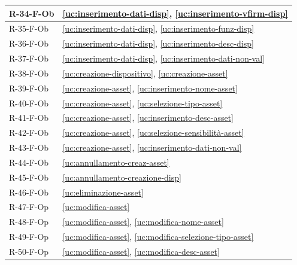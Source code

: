 ﻿\documentclass[a4paper,12pt]{article}
\begin{document}
{\begin{longtable}{|
      >{\centering\arraybackslash}p{}|
      >{\centering\arraybackslash}p{}|
      }
            R-34-F-Ob       & \ref{uc:inserimento-dati-disp}, \ref{uc:inserimento-vfirm-disp}         \\ \hline
            R-35-F-Ob       & \ref{uc:inserimento-dati-disp}, \ref{uc:inserimento-funz-disp}         \\ \hline
            R-36-F-Ob       & \ref{uc:inserimento-dati-disp}, \ref{uc:inserimento-desc-disp}         \\ \hline
            R-37-F-Ob       & \ref{uc:inserimento-dati-disp}, \ref{uc:inserimento-dati-non-val}                 \\ \hline
            R-38-F-Ob       & \ref{uc:creazione-dispositivo}, \ref{uc:creazione-asset}                     \\ \hline
            R-39-F-Ob       & \ref{uc:creazione-asset}, \ref{uc:inserimento-nome-asset}                 \\ \hline
            R-40-F-Ob       & \ref{uc:creazione-asset}, \ref{uc:selezione-tipo-asset}                 \\ \hline
            R-41-F-Ob       & \ref{uc:creazione-asset}, \ref{uc:inserimento-desc-asset}                 \\ \hline
            R-42-F-Ob       & \ref{uc:creazione-asset}, \ref{uc:selezione-sensibilità-asset}                 \\ \hline
            R-43-F-Ob       & \ref{uc:creazione-asset}, \ref{uc:inserimento-dati-non-val}                     \\ \hline
            R-44-F-Ob       & \ref{uc:annullamento-creaz-asset}                                               \\ \hline
            R-45-F-Ob       & \ref{uc:annullamento-creazione-disp}                                               \\ \hline
            R-46-F-Ob       & \ref{uc:eliminazione-asset}                                               \\ \hline
            R-47-F-Op       & \ref{uc:modifica-asset}                                               \\ \hline
            R-48-F-Op       & \ref{uc:modifica-asset}, \ref{uc:modifica-nome-asset}                 \\ \hline
            R-49-F-Op       & \ref{uc:modifica-asset}, \ref{uc:modifica-selezione-tipo-asset}                 \\ \hline
            R-50-F-Op       & \ref{uc:modifica-asset}, \ref{uc:modifica-desc-asset}                 \\ \hline

\end{longtable}}
\end{document}
